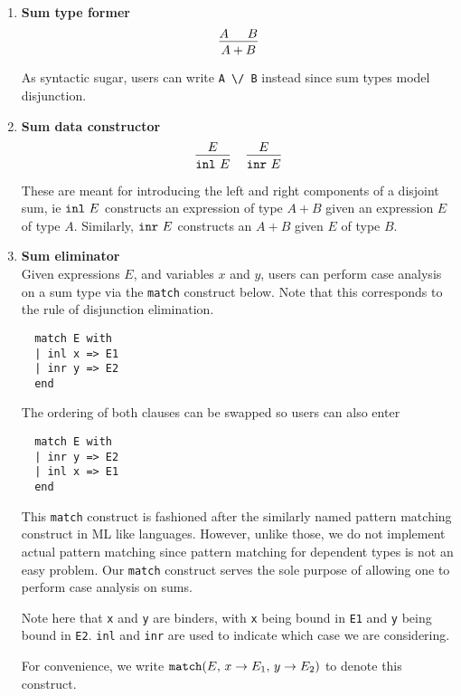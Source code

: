 \documentclass{article}
\begin{document}
\begin{enumerate}
\item \textbf{Sum type former} \\
\[
  \begin{prooftree}
    \hypo{A}
    \hypo{B}
    \infer2{A + B}
  \end{prooftree}
\]

As syntactic sugar, users can write \verb|A \/ B| instead since sum types
model disjunction.

\item \textbf{Sum data constructor} \\
\begin{gather*}
  \begin{prooftree}
    \hypo{E}
    \infer1{\inl \,\, E}
  \end{prooftree}
~ \quad
  \begin{prooftree}
    \hypo{E}
    \infer1{\inr \,\, E}
  \end{prooftree}
\end{gather*}

These are meant for introducing the left and right components of a disjoint sum,
ie $\texttt{inl} \,\, E$ constructs an expression of type $A + B$ given an expression $E$ of
type $A$. Similarly, $\texttt{inr} \,\, E$ constructs an $A + B$ given $E$ of type $B$.

\item \textbf{Sum eliminator} \\
Given expressions $E$, and variables $x$ and $y$, users can perform case analysis
on a sum type via the \verb|match| construct below.
Note that this corresponds to the rule of disjunction elimination.

\begin{verbatim}
  match E with
  | inl x => E1
  | inr y => E2
  end
\end{verbatim}

The ordering of both clauses can be swapped so users can also enter
\begin{verbatim}
  match E with
  | inr y => E2
  | inl x => E1
  end
\end{verbatim}

This \verb|match| construct is fashioned after the similarly named pattern
matching construct in ML like languages.
However, unlike those, we do not implement actual pattern matching since pattern
matching for dependent types is not an easy problem.
Our \verb|match| construct serves the sole purpose of allowing one to perform
case analysis on sums.

Note here that \verb|x| and \verb|y| are binders, with \verb|x| being bound in
\verb|E1| and \verb|y| being bound in \verb|E2|.
\verb|inl| and \verb|inr| are used to indicate which case we are
considering.

For convenience, we write 
$\texttt{match}(E, \, x \rightarrow E_1, \, y \rightarrow E_2)$ to denote this
construct.

\end{enumerate}
\end{document}

